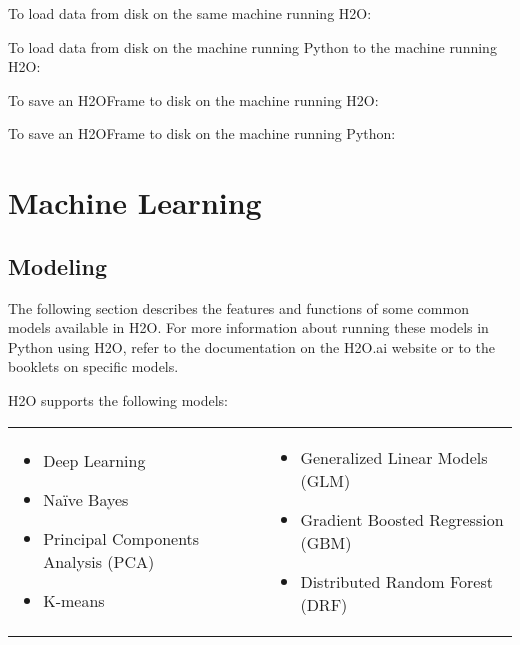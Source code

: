 To load data from disk on the same machine running H2O:


To load data from disk on the machine running Python to the machine running H2O:


To save an H2OFrame to disk on the machine running H2O:


To save an H2OFrame to disk on the machine running Python:



\section{Machine Learning}

\subsection{Modeling}
The following section describes the features and functions of some common models available in H2O.  For more information about running these models in Python using H2O, refer to the documentation on
the H2O.ai website or to the booklets on specific models.

\begin{minipage}{\textwidth}
H2O supports the following models:  


\begin{frame}%

\begin{tabular}{p{5.5cm}p{5.5cm}}

\begin{itemize}
  \item Deep Learning
  \item Na\"{i}ve Bayes
  \item Principal Components Analysis (PCA)
  \item K-means
\end{itemize} &

\begin{itemize}
  \item Generalized Linear Models (GLM) 
  \item Gradient Boosted Regression (GBM)
  \item Distributed Random Forest (DRF)
\end{itemize}

\end{tabular}

\end{frame}
\end{minipage}

